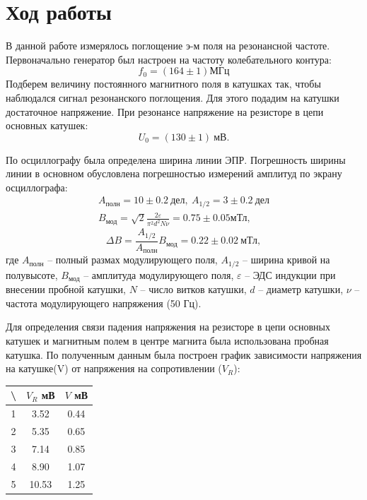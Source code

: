 \documentclass[a4paper,12pt]{article} %
\begin{document}
  \section{Ход работы}
    В данной работе измерялось поглощение э-м поля на резонансной частоте.
    Первоначально генератор был настроен на частоту колебательного контура:
    \begin{equation}
      f_0 = (164 \pm 1) МГц
    \end{equation}
    Подберем величину постоянного магнитного поля в катушках так, чтобы наблюдался сигнал резонанского поглощения. 
    Для этого подадим на катушки достаточное напряжение.
    При резонансе напряжение на резисторе в цепи основных катушек:
    \begin{equation}
      U_0 = (130 \pm 1) \ \text{мВ}.
    \end{equation}\par
    По осциллографу была определена ширина линии ЭПР. 
    Погрешность ширины линии в основном обусловлена погрешностью измерений амплитуд по экрану осциллографа: 
    \begin{equation}
      \begin{gathered}
          A_\text{полн} = 10 \pm 0.2 \ \text{дел}, \ A_{1/2} = 3 \pm 0.2 \ \text{дел} \\
          B_\text{мод} = \sqrt{2} \frac{2\varepsilon}{\pi^2d^2N\nu} = 0.75\pm 0.05 \text{мТл},
      \end{gathered}
    \end{equation}
    \begin{equation}
      \Delta B = \frac{A_{1/2}}{A_{\text{полн}}}B_\text{мод} = 0.22 \pm 0.02 \ \text{мТл},
    \end{equation}
    где $A_\text{полн}$ -- полный размах модулирующего поля, $A_{1/2}$ -- ширина кривой на полувысоте, $B_\text{мод}$ -- амплитуда модулирующего поля,
    $\varepsilon$ -- ЭДС индукции при внесении пробной катушки, $N$ -- число витков катушки, $d$ -- диаметр катушки, $\nu$ -- частота модулирующего напряжения (50 Гц).\par
    Для определения связи падения напряжения на резисторе в цепи основных катушек и магнитным полем в центре магнита была использована пробная катушка.
    По полученным данным была построен график зависимости напряжения на катушке(V) от напряжения на сопротивлении ($V_R$):
    \begin{table}[h!]
      \centering
      \begin{tabular}{|c|c|c|}
      \hline
      \textbackslash{} & $V_R$ мВ & $V$ мВ \\ \hline
      1                & 3.52     & 0.44   \\ \hline
      2                & 5.35     & 0.65   \\ \hline
      3                & 7.14     & 0.85   \\ \hline
      4                & 8.90     & 1.07   \\ \hline
      5                & 10.53    & 1.25   \\ \hline
      \end{tabular}
    \end{table}
\end{document}
